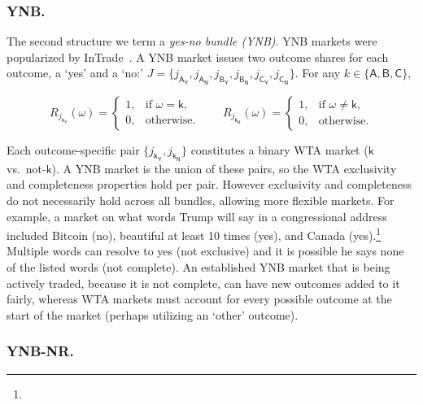  
 \subsubsection{YNB.}
 
The second structure we term a \textit{yes-no bundle (YNB)}. YNB markets were popularized by InTrade~\cite{intrade}. A YNB market issues two outcome shares for each outcome, a `yes' and a `no:'  $J=\{j_{\mathsf{A_Y}}, j_{\mathsf{A_N}}, j_{\mathsf{B_Y}}, j_{\mathsf{B_N}}, j_{\mathsf{C_Y}},j_{\mathsf{C_N}} \}$. For any $k\in\{\mathsf{A},\mathsf{B},\mathsf{C}\}$,

\begin{equation}
R_{j_{\mathsf{k_Y}}}(\omega)=
\begin{cases}
1, & \text{if } \omega=\mathsf{k},\\
0, & \text{otherwise.}
\end{cases}
\qquad
R_{j_{\mathsf{k_N}}}(\omega)=
\begin{cases}
1, & \text{if } \omega\neq\mathsf{k},\\
0, & \text{otherwise.}
\end{cases}
\end{equation}

Each outcome-specific pair $\{j_{\mathsf{k_Y}}, j_{\mathsf{k_N}}\}$ constitutes a binary WTA market ($\mathsf{k}$ vs.\ not-$\mathsf{k}$). A YNB market is the union of these pairs, so the WTA exclusivity and completeness properties hold per pair. However exclusivity and completeness do not necessarily hold across all bundles, allowing more flexible markets. For example, a market on what words Trump will say in a congressional address included Bitcoin (no), beautiful at least 10 times (yes), and Canada (yes).\footnote{} Multiple words can resolve to yes (not exclusive) and it is possible he says none of the listed words (not complete). An established YNB market that is being actively traded, because it is not complete, can have new outcomes added to it fairly, whereas WTA markets must account for every possible outcome at the start of the market (perhaps utilizing an `other' outcome).

\subsubsection{YNB-NR.}

